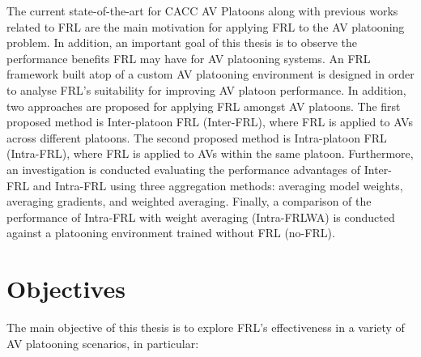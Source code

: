 The current state-of-the-art for CACC AV Platoons along with previous
works related to FRL are the main motivation for applying FRL to the AV platooning problem. In addition,
an important goal of this thesis is to observe the performance
benefits FRL may have for AV platooning systems.  An FRL framework built atop of a custom AV
platooning environment is designed in order to analyse FRL's suitability for improving AV platoon performance.
In addition, two approaches are proposed for applying FRL amongst AV platoons. The first proposed
method is Inter-platoon FRL (Inter-FRL), where FRL is applied to AVs across different platoons.
The second proposed method is Intra-platoon FRL (Intra-FRL), where FRL is applied to AVs
within the same platoon.  Furthermore, an investigation is conducted evaluating the performance advantages of
Inter-FRL and Intra-FRL using three aggregation methods: averaging model weights,
averaging gradients, and weighted averaging.  Finally, a comparison of the performance
of Intra-FRL with weight averaging (Intra-FRLWA) is conducted against a platooning environment trained
without FRL (no-FRL).

\section{Objectives}
The main objective of this thesis is to explore FRL's effectiveness in a variety of AV
platooning scenarios, in particular:

